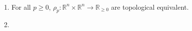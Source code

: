 \begin{note} \ 
	\begin{enumerate}
		\item For all $p \ge 0$, $\rho_p: \mathbb R^n \times \mathbb R^n \to \mathbb R_{\ge 0}$ are topological equivalent.
		
		\item 
	\end{enumerate}
\end{note}





































%